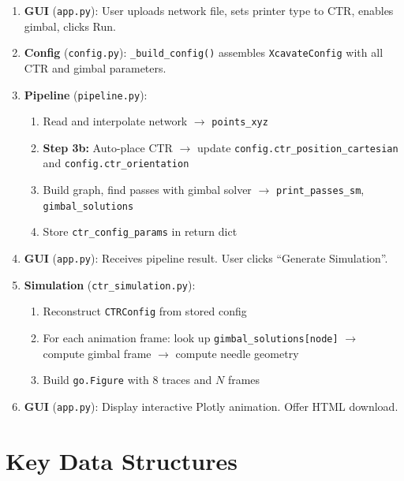 \documentclass[11pt,a4paper]{article}
\newcommand{\filename}[1]{\texttt{\textcolor{accentblue}{#1}}}
\newcommand{\funcname}[1]{\texttt{\textcolor{codepurple}{#1}}}
\begin{document}
\begin{enumerate}
    \item \textbf{GUI} (\filename{app.py}): User uploads network file, sets printer type to CTR, enables gimbal, clicks Run.

    \item \textbf{Config} (\filename{config.py}): \funcname{\_build\_config()} assembles \texttt{XcavateConfig} with all CTR and gimbal parameters.

    \item \textbf{Pipeline} (\filename{pipeline.py}):
    \begin{enumerate}[nosep,label=(\alph*)]
        \item Read and interpolate network $\to$ \texttt{points\_xyz}
        \item \textbf{Step 3b:} Auto-place CTR $\to$ update \texttt{config.ctr\_position\_cartesian} and \texttt{config.ctr\_orientation}
        \item Build graph, find passes with gimbal solver $\to$ \texttt{print\_passes\_sm}, \texttt{gimbal\_solutions}
        \item Store \texttt{ctr\_config\_params} in return dict
    \end{enumerate}

    \item \textbf{GUI} (\filename{app.py}): Receives pipeline result. User clicks ``Generate Simulation''.

    \item \textbf{Simulation} (\filename{ctr\_simulation.py}):
    \begin{enumerate}[nosep,label=(\alph*)]
        \item Reconstruct \texttt{CTRConfig} from stored config
        \item For each animation frame: look up \texttt{gimbal\_solutions[node]} $\to$ compute gimbal frame $\to$ compute needle geometry
        \item Build \texttt{go.Figure} with 8 traces and $N$ frames
    \end{enumerate}

    \item \textbf{GUI} (\filename{app.py}): Display interactive Plotly animation. Offer HTML download.
\end{enumerate}

\section{Key Data Structures}
\label{sec:datastructures}
\end{document}
